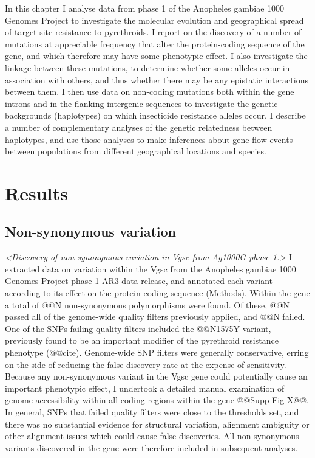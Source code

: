 \documentclass[a4paper,11pt,abstracton,hidelinks]{scrartcl}
\begin{document}
In this chapter I analyse data from phase 1 of the Anopheles gambiae 1000 Genomes Project to investigate the molecular evolution and geographical spread of target-site resistance to pyrethroids.
%
I report on the discovery of a number of mutations at appreciable frequency that alter the protein-coding sequence of the gene, and which therefore may have some phenotypic effect.
%
I also investigate the linkage between these mutations, to determine whether some alleles occur in association with others, and thus whether there may be any epistatic interactions between them.
%
I then use data on non-coding mutations both within the gene introns and in the flanking intergenic sequences to investigate the genetic backgrounds (haplotypes) on which insecticide resistance alleles occur.
%
I describe a number of complementary analyses of the genetic relatedness between haplotypes, and use those analyses to make inferences about gene flow events between populations from different geographical locations and species.


\section*{Results}


\subsection*{Non-synonymous variation}


\textit{<Discovery of non-synonymous variation in Vgsc from Ag1000G phase 1.>}
%
I extracted data on variation within the Vgsc from the Anopheles gambiae 1000 Genomes Project phase 1 AR3 data release, and annotated each variant according to its effect on the protein coding sequence (Methods).
%
Within the gene a total of @@N non-synonymous polymorphisms were found.
%
Of these, @@N passed all of the genome-wide quality filters previously applied, and @@N failed.
%
One of the SNPs failing quality filters included the @@N1575Y variant, previously found to be an important modifier of the pyrethroid resistance phenotype (@@cite).
%
Genome-wide SNP filters were generally conservative, erring on the side of reducing the false discovery rate at the expense of sensitivity.
%
Because any non-synonymous variant in the Vgsc gene could potentially cause an important phenotypic effect, I undertook a detailed manual examination of genome accessibility within all coding regions within the gene @@Supp Fig X@@.
%
In general, SNPs that failed quality filters were close to the thresholds set, and there was no substantial evidence for structural variation, alignment ambiguity or other alignment issues which could cause false discoveries.
%
All non-synonymous variants discovered in the gene were therefore included in subsequent analyses.
\end{document}
